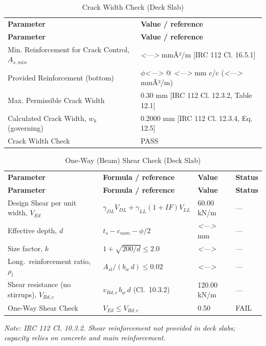 \documentclass[12pt,a4paper]{report}
\numberwithin{figure}{chapter}
\newcommand{\placeholder}[1]{\textit{\textless #1\textgreater}}
\begin{document}
\vspace{1em}
\begin{longtable}{|L{6.58cm}|L{8.0cm}|}
\caption{Crack Width Check (Deck Slab)}\\
\hline
\textbf{Parameter} & \textbf{Value / reference} \\
\hline
\endfirsthead
\hline
\textbf{Parameter} & \textbf{Value / reference} \\
\hline
\endhead

\textnormal{Min. Reinforcement for Crack Control, $A_{s,min}$} & \placeholder{---} mmÂ²/m [IRC 112 Cl. 16.5.1] \\[6pt]
\hline
\textnormal{Provided Reinforcement (bottom)} & $\phi$\placeholder{---} @ \placeholder{---} mm c/c (\placeholder{---} mmÂ²/m) \\[6pt]
\hline
\textnormal{Max. Permissible Crack Width} & 0.30 mm [IRC 112 Cl. 12.3.2, Table 12.1] \\[6pt]
\hline
\textnormal{Calculated Crack Width, $w_k$ (governing)} & 0.2000 mm [IRC 112 Cl. 12.3.4, Eq. 12.5] \\[6pt]
\hline
\textnormal{Crack Width Check} & PASS \\[6pt]
\hline

\end{longtable}

\vspace{1em}
\begin{longtable}{|L{4.85cm}|C{3.09cm}|C{3.97cm}|C{1.77cm}|}
\caption{One-Way (Beam) Shear Check (Deck Slab)}\\
\hline
\textbf{Parameter} & \textbf{Formula / reference} & \textbf{Value} & \textbf{Status} \\
\hline
\endfirsthead
\hline
\textbf{Parameter} & \textbf{Formula / reference} & \textbf{Value} & \textbf{Status} \\
\hline
\endhead

Design Shear per unit width, $V_{Ed}$ & $\gamma_{DL} V_{DL} + \gamma_{LL}(1{+}IF)V_{LL}$ & 60.00 kN/m & --- \\[6pt]
\hline
Effective depth, $d$ & $t_s - c_{nom} - \phi/2$ & \placeholder{---} mm & --- \\[6pt]
\hline
Size factor, $k$ & $1 + \sqrt{200/d} \leq 2.0$ & \placeholder{---} & --- \\[6pt]
\hline
Long.\ reinforcement ratio, $\rho_l$ & $A_{sl}/(b_w\,d) \leq 0.02$ & \placeholder{---} & --- \\[6pt]
\hline
Shear resistance (no stirrups), $V_{Rd,c}$ & $v_{Rd,c}\,b_w\,d$ (Cl.\ 10.3.2) & 120.00 kN/m & --- \\[6pt]
\hline
One-Way Shear Check & $V_{Ed} \leq V_{Rd,c}$ & 0.50 & FAIL \\[6pt]
\hline

\end{longtable}
\noindent\textit{Note: IRC 112 Cl. 10.3.2. Shear reinforcement not provided in deck slabs; capacity relies on concrete and main reinforcement.}
\end{document}
